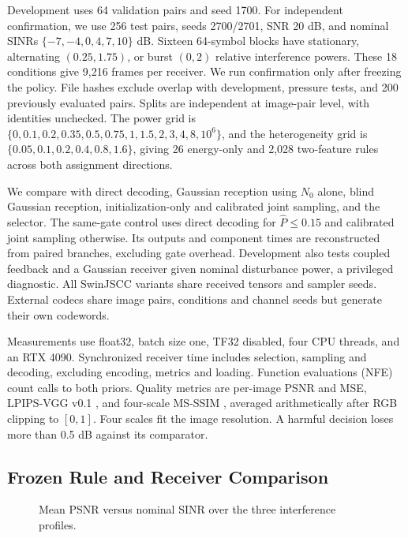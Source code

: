 \documentclass[conference]{IEEEtran}
\begin{document}
Development uses 64 validation pairs and seed 1700. For independent
confirmation, we use 256 test pairs, seeds 2700/2701, SNR 20 dB, and nominal SINRs
$\{-7,-4,0,4,7,10\}$ dB. Sixteen 64-symbol blocks have stationary,
alternating $(0.25,1.75)$, or burst $(0,2)$ relative interference powers.
These 18 conditions give 9,216 frames per receiver. We run confirmation only
after freezing the policy. File hashes exclude overlap with development,
pressure tests, and 200 previously evaluated pairs. Splits are independent at
image-pair level, with identities unchecked. The power grid is
$\{0,0.1,0.2,0.35,0.5,0.75,1,1.5,2,3,4,8,10^6\}$, and
the heterogeneity grid is $\{0.05,0.1,0.2,0.4,0.8,1.6\}$, giving 26 energy-only
and 2,028 two-feature rules across both assignment directions.

We compare with direct decoding, Gaussian reception using $N_0$ alone,
blind Gaussian reception, initialization-only and calibrated joint sampling,
and the selector. The same-gate control uses direct decoding for
$\widehat P\le0.15$ and calibrated joint sampling otherwise. Its outputs and
component times are reconstructed from paired branches, excluding gate
overhead. Development also tests coupled feedback and a Gaussian receiver
given nominal disturbance power, a privileged diagnostic. All SwinJSCC variants
share received tensors and sampler seeds. External codecs share image pairs,
conditions and channel seeds but generate their own codewords.

Measurements use float32, batch size one, TF32 disabled, four CPU threads, and
an RTX 4090. Synchronized receiver time includes selection, sampling and
decoding, excluding encoding, metrics and loading. Function evaluations (NFE)
count calls to both priors.
Quality metrics are per-image PSNR and MSE, LPIPS-VGG v0.1 \cite{zhang2018lpips},
and four-scale MS-SSIM \cite{wang2003msssim}, averaged arithmetically after RGB
clipping to $[0,1]$. Four scales fit the image resolution.
A harmful decision loses more than 0.5 dB against its comparator.

\subsection{Frozen Rule and Receiver Comparison}
\begin{table}[t]
\centering
\caption{Reconstruction quality and receiver cost on the confirmation set.}
\label{tab:main}

\end{table}
\begin{figure}[t]
\centering
{}
\caption{Mean PSNR versus nominal SINR over the three interference profiles.}
\label{fig:quality}
\end{figure}
\end{document}
